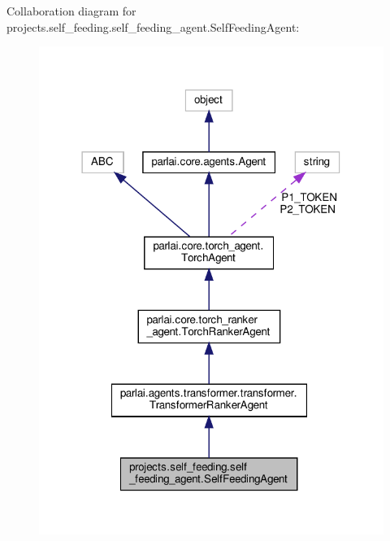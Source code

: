 Collaboration diagram for projects.\+self\+\_\+feeding.\+self\+\_\+feeding\+\_\+agent.\+Self\+Feeding\+Agent\+:
\nopagebreak
\begin{figure}[H]
\begin{center}
\leavevmode
\includegraphics[width=318pt]{de/d2d/classprojects_1_1self__feeding_1_1self__feeding__agent_1_1SelfFeedingAgent__coll__graph}
\end{center}
\end{figure}
